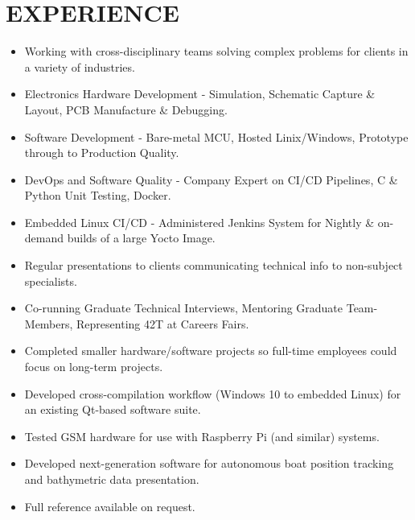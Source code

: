\section{EXPERIENCE}
{
  {\begin{itemize}
      \item Working with cross-disciplinary teams solving complex problems for clients in a variety of industries. 
      \item Electronics Hardware Development - Simulation, Schematic Capture \& Layout, PCB Manufacture \& Debugging.
      \item Software Development - Bare-metal MCU, Hosted Linix/Windows, Prototype through to Production Quality. 
      \item DevOps and Software Quality - Company Expert on CI/CD Pipelines, C \& Python Unit Testing, Docker.
      \item Embedded Linux CI/CD - Administered Jenkins System for Nightly \& on-demand builds of a large Yocto Image.
      \item Regular presentations to clients communicating technical info to non-subject specialists.
      \item Co-running Graduate Technical Interviews, Mentoring Graduate Team-Members, Representing 42T at Careers Fairs. 
  \end{itemize}
  }
}
  
{
  {\begin{itemize}
      \item Completed smaller hardware/software projects so full-time employees could focus on long-term projects.
      \item Developed cross-compilation workflow (Windows 10 to embedded Linux) for an existing Qt-based software suite.
      \item Tested GSM hardware for use with Raspberry Pi (and similar) systems.   
      \item Developed next-generation software for autonomous boat position tracking and bathymetric data presentation.
      \item Full reference available on request.
  \end{itemize}
  }
}


